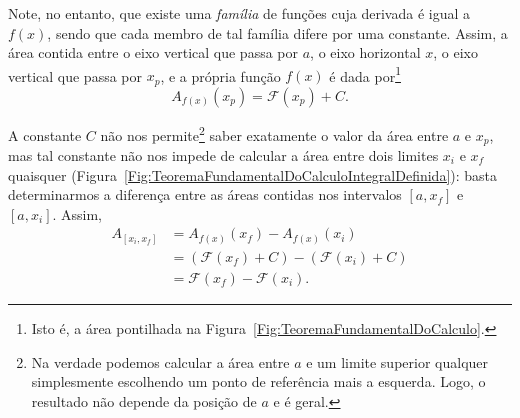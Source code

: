 \noindent{}Note, no entanto, que existe uma \emph{família} de funções cuja derivada é igual a $f(x)$, sendo que cada membro de tal família difere por uma constante. Assim, a área contida entre o eixo vertical que passa por $a$, o eixo horizontal $x$, o eixo vertical que passa por $x_p$, e a própria função $f(x)$ é dada por\footnote[][-2cm]{Isto é, a área pontilhada na Figura~\ref{Fig:TeoremaFundamentalDoCalculo}.}
\begin{equation}
    A_{f(x)}(x_p) = \mathcal{F}(x_p) + C.
\end{equation}
 
A constante $C$ não nos permite\footnote{Na verdade podemos calcular a área entre $a$ e um limite superior qualquer simplesmente escolhendo um ponto de referência mais a esquerda. Logo, o resultado  não depende da posição de $a$ e é geral.} saber exatamente o valor da área entre $a$ e $x_p$, mas tal constante não nos impede de calcular a área entre dois limites $x_i$ e $x_f$ quaisquer (Figura~\ref{Fig:TeoremaFundamentalDoCalculoIntegralDefinida}): basta determinarmos a diferença entre as áreas contidas nos intervalos $[a,x_f]$ e $[a,x_i]$. Assim,
\begin{align}
    A_{[x_i,x_f]} &= A_{f(x)}(x_f) - A_{f(x)}(x_i) \\
    &= (\mathcal{F}(x_f) + C) - (\mathcal{F}(x_i) + C) \\
    &= \mathcal{F}(x_f) - \mathcal{F}(x_i).
\end{align}

